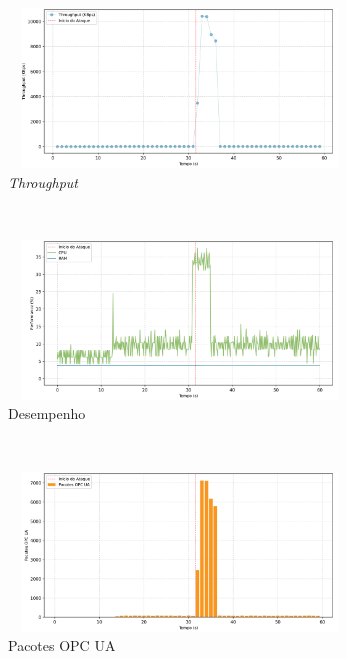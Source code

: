 \begin{apendicesenv}
\begin{figure}[htbp!]
    \centering
    \caption{\label{fig:2-dos_function_call_null_deref}Gráficos do ataque de DoS pela chamada da função \textit{Dereference} nula - nível de segurança: `Sign \& Encrypt'.}
    \begin{subfigure}[t]{0.5\textwidth}
        \centering
        \caption{\textit{Throughput}}
        \includegraphics[width=1\textwidth, height=120pt]{USPSC-img/output/cropped/2-dos_function_call_null_deref-tput.png}
    \end{subfigure}%
    ~ 
    \begin{subfigure}[t]{0.5\textwidth}
        \centering
        \caption{Desempenho}
        \includegraphics[width=1\textwidth, height=120pt]{USPSC-img/output/cropped/2-dos_function_call_null_deref-perf.png}
    \end{subfigure}%
    \\
    \begin{subfigure}[t]{0.5\textwidth}
        \centering
        \caption{Pacotes OPC UA}
        \includegraphics[width=1\textwidth, height=120pt]{USPSC-img/output/cropped/2-dos_function_call_null_deref-pack.png}
    \end{subfigure}%
    ~
    \begin{subfigure}[t]{0.5\textwidth}

\end{subfigure}
\end{figure}
\end{apendicesenv}
